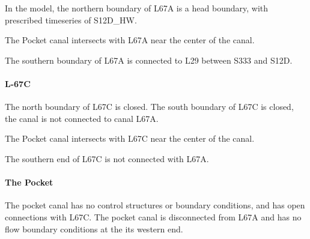 In the model, the northern boundary of L67A is a head boundary, with prescribed timeseries of S12D\_HW.

The Pocket canal intersects with L67A near the center of the canal.

The southern boundary of L67A is connected to L29 between S333 and S12D.



\paragraph{L-67C}
The north boundary of L67C is closed. The south boundary of L67C is closed, the canal is not connected to canal L67A.

The Pocket canal intersects with L67C near the center of the canal.

The southern end of L67C is not connected with L67A.


\paragraph{The Pocket}

The pocket canal has no control structures or boundary conditions, and has open connections with L67C. The pocket canal is disconnected from L67A and has no flow boundary conditions at the its western end.



